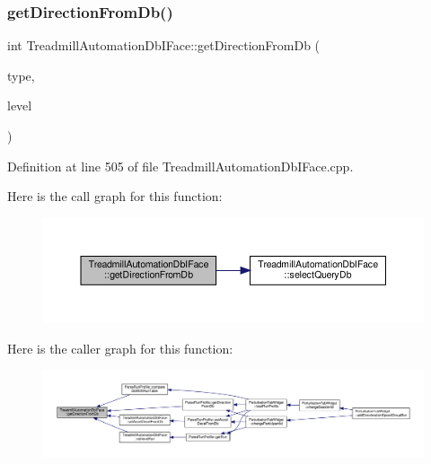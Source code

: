 \subsubsection{\texorpdfstring{get\+Direction\+From\+Db()}{getDirectionFromDb()}}
{\footnotesize\ttfamily int Treadmill\+Automation\+Db\+I\+Face\+::get\+Direction\+From\+Db (\begin{DoxyParamCaption}\item[{Q\+String}]{type,  }\item[{Q\+String}]{level }\end{DoxyParamCaption})}



Definition at line 505 of file Treadmill\+Automation\+Db\+I\+Face.\+cpp.

Here is the call graph for this function\+:
\nopagebreak
\begin{figure}[H]
\begin{center}
\leavevmode
\includegraphics[width=350pt]{class_treadmill_automation_db_i_face_a21cf6860ec06b988509d671c21693342_cgraph}
\end{center}
\end{figure}
Here is the caller graph for this function\+:
\nopagebreak
\begin{figure}[H]
\begin{center}
\leavevmode
\includegraphics[width=350pt]{class_treadmill_automation_db_i_face_a21cf6860ec06b988509d671c21693342_icgraph}
\end{center}
\end{figure}
\mbox{\label{class_treadmill_automation_db_i_face_a50b00503be3596bd8db68d51ef2ae9b1}} 
